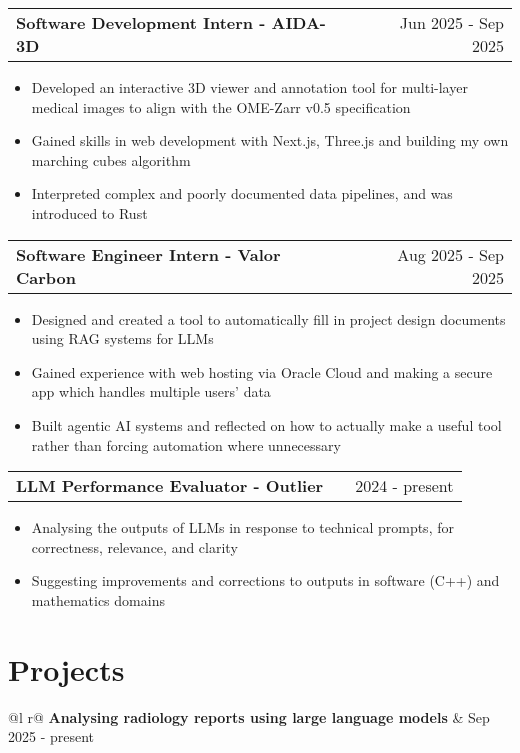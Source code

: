 \documentclass[a4paper,12pt]{article}
\makeatletter
\newenvironment{joblong}[2]
    {
    \begin{tabularx}{\linewidth}{@{}l X r@{}}
    \textbf{#1} & \hfill &  #2 \\[3.75pt]
    \end{tabularx}
    \begin{minipage}[t]{\linewidth}
    \begin{itemize}[nosep,after=\strut, leftmargin=1em, itemsep=3pt,label=--]
    }
    {
    \end{itemize}
    \end{minipage}    
    }
\makeatother
\begin{document}
\begin{joblong}{Software Development Intern - AIDA-3D}{Jun 2025 - Sep 2025}
\item Developed an interactive 3D viewer and annotation tool for multi-layer medical images to align with the OME-Zarr v0.5 specification
\item Gained skills in web development with Next.js, Three.js and building my own marching cubes algorithm
\item Interpreted complex and poorly documented data pipelines, and was introduced to Rust
\end{joblong}

\begin{joblong}{Software Engineer Intern - Valor Carbon}{Aug 2025 - Sep 2025}
\item Designed and created a tool to automatically fill in project design documents using RAG systems for LLMs
\item Gained experience with web hosting via Oracle Cloud and making a secure app which handles multiple users' data
\item Built agentic AI systems and reflected on how to actually make a useful tool rather than forcing automation where unnecessary
\end{joblong}

\begin{joblong}{LLM Performance Evaluator - Outlier}{2024 - present}
\item Analysing the outputs of LLMs in response to technical prompts, for correctness, relevance, and clarity
\item Suggesting improvements and corrections to outputs in software (C++) and mathematics domains
\end{joblong}

  
\section{Projects}

\begin{tabularx}{\linewidth}{ @{}l r@{} }
\textbf{Analysing radiology reports using large language models} & \hfill Sep 2025 - present \\[3.75pt]
  \\
\end{tabularx}
\end{document}
